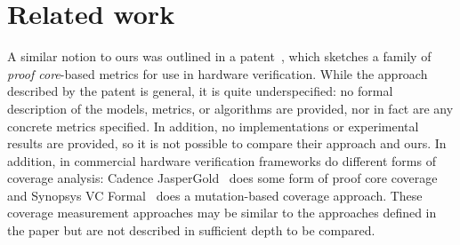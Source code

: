 \section{Related work}
\label{sec:related}
 

A similar notion to ours was outlined in a patent~\cite{hanna2015formal}, which sketches a family of {\em proof core}-based metrics for use in hardware verification.  While the approach described by the patent is general, it is quite underspecified:
no formal description of the models, metrics, or algorithms are provided, nor in fact are any concrete metrics specified. In addition, no implementations or experimental results are provided, so it is not possible to compare their approach and ours. In addition, in commercial hardware verification frameworks do different forms of coverage analysis: Cadence JasperGold~\cite{jasper_gold} does some form of proof core coverage and Synopsys VC Formal~\cite{Synopsys_VC_formal} does a mutation-based coverage approach.  These coverage measurement approaches may be similar to the approaches defined in the paper but are not described in sufficient depth to be compared.

